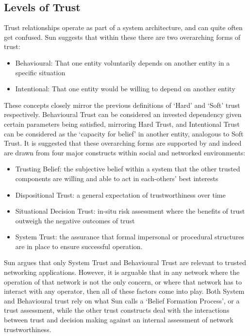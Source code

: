 \subsection{Levels of Trust}
Trust relationships operate as part of a system architecture, and can quite often get confused.
Sun\cite{Sun2008} suggests that within these there are two overarching forms of trust:
\begin{itemize}
  \item Behavioural: That one entity voluntarily depends on another entity in a specific situation
  \item Intentional: That one entity would be willing to depend on another entity
\end{itemize}
These concepts closely mirror the previous definitions of ‘Hard’ and ‘Soft’ trust respectively.
Behavioural Trust can be considered an invested dependency given certain parameters being satisfied, mirroring Hard Trust, and Intentional Trust can be considered as the ‘capacity for belief’ in another entity, analogous to Soft Trust.
It is suggested that these overarching forms are supported by and indeed are drawn from four major constructs within social and networked environments:
\begin{itemize}
  \item Trusting Belief: the subjective belief within a system that the other trusted components are willing and able to act in each-others’ best interests
  \item Dispositional Trust: a general expectation of trustworthiness over time 
  \item Situational Decision Trust: in-situ risk assessment where the benefits of trust outweigh the negative outcomes of trust
  \item System Trust: the assurance that formal impersonal or procedural structures are in place to ensure successful operation.
\end{itemize}
Sun argues that only System Trust and Behavioural Trust are relevant to trusted networking applications.
However, it is arguable that in any network where the operation of that network is not the only concern, or where that network has to interact with any operator, then all of these factors come into play.
Both System and Behavioural trust rely on what Sun calls a ‘Belief Formation Process’, or a trust assessment, while the other trust constructs deal with the interactions between trust and decision making against an internal assessment of network trustworthiness.

